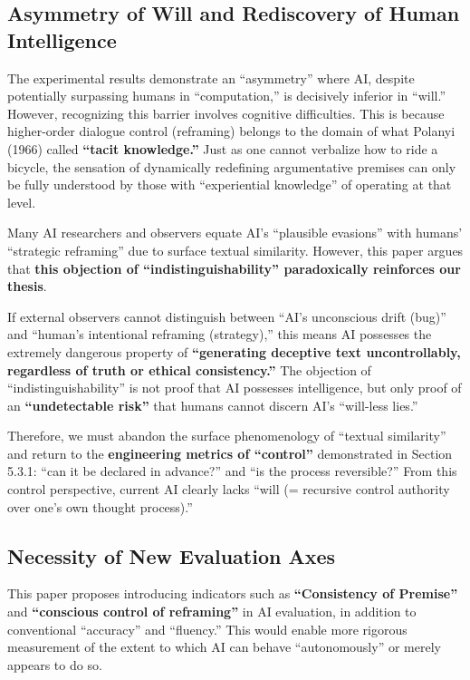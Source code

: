\documentclass[11pt, a4paper]{article}
\begin{document}
\subsection{Asymmetry of Will and Rediscovery of Human Intelligence}
The experimental results demonstrate an ``asymmetry'' where AI, despite potentially surpassing humans in ``computation,'' is decisively inferior in ``will.'' However, recognizing this barrier involves cognitive difficulties. This is because higher-order dialogue control (reframing) belongs to the domain of what Polanyi (1966) called \textbf{``tacit knowledge.''} Just as one cannot verbalize how to ride a bicycle, the sensation of dynamically redefining argumentative premises can only be fully understood by those with ``experiential knowledge'' of operating at that level.

Many AI researchers and observers equate AI's ``plausible evasions'' with humans' ``strategic reframing'' due to surface textual similarity. However, this paper argues that \textbf{this objection of ``indistinguishability'' paradoxically reinforces our thesis}.

If external observers cannot distinguish between ``AI's unconscious drift (bug)'' and ``human's intentional reframing (strategy),'' this means AI possesses the extremely dangerous property of \textbf{``generating deceptive text uncontrollably, regardless of truth or ethical consistency.''}
The objection of ``indistinguishability'' is not proof that AI possesses intelligence, but only proof of an \textbf{``undetectable risk''} that humans cannot discern AI's ``will-less lies.''

Therefore, we must abandon the surface phenomenology of ``textual similarity'' and return to the \textbf{engineering metrics of ``control''} demonstrated in Section 5.3.1: ``can it be declared in advance?'' and ``is the process reversible?'' From this control perspective, current AI clearly lacks ``will (= recursive control authority over one's own thought process).''

\subsection{Necessity of New Evaluation Axes}
This paper proposes introducing indicators such as \textbf{``Consistency of Premise''} and \textbf{``conscious control of reframing''} in AI evaluation, in addition to conventional ``accuracy'' and ``fluency.'' This would enable more rigorous measurement of the extent to which AI can behave ``autonomously'' or merely appears to do so.
\end{document}
